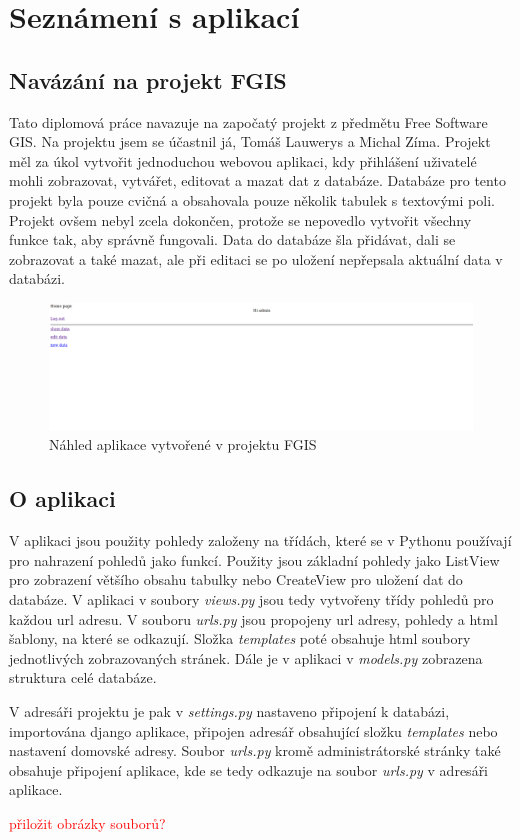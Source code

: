\chapter{Seznámení s aplikací}
\label{3-seznameni-s-aplikaci}

\section{Navázání na projekt FGIS}

Tato diplomová práce navazuje na započatý projekt z předmětu Free
Software GIS. Na projektu jsem se účastnil já, Tomáš Lauwerys a Michal
Zíma. Projekt měl za úkol vytvořit jednoduchou webovou aplikaci, kdy
přihlášení uživatelé mohli zobrazovat, vytvářet, editovat a mazat dat
z databáze. Databáze pro tento projekt byla pouze cvičná a obsahovala
pouze několik tabulek s textovými poli. Projekt ovšem nebyl zcela
dokončen, protože se nepovedlo vytvořit všechny funkce tak, aby
správně fungovali. Data do databáze šla přidávat, dali se zobrazovat a
také mazat, ale při editaci se po uložení nepřepsala aktuální data v
databázi.

\begin{figure}[H] \centering
    \includegraphics[width=400pt]{./pictures/4-nahled-menu-fgis.PNG}
    \caption[Náhled aplikace vytvořené v projektu FGIS]{Náhled aplikace vytvořené v projektu FGIS}
	\label{fig:Náhled aplikace}              
\end{figure}

 \newpage
 
 \section{O aplikaci}

 V aplikaci jsou použity pohledy založeny na třídách, které se v
 Pythonu používají pro nahrazení pohledů jako funkcí. Použity jsou
 základní pohledy jako ListView pro zobrazení většího obsahu tabulky
 nebo CreateView pro uložení dat do databáze. V aplikaci v soubory
 \emph{views.py} jsou tedy vytvořeny třídy pohledů pro každou url
 adresu. V souboru \emph{urls.py} jsou propojeny url adresy, pohledy a
 html šablony, na které se odkazují. Složka \emph{templates} poté
 obsahuje html soubory jednotlivých zobrazovaných stránek. Dále je v
 aplikaci v \emph{models.py} zobrazena struktura celé databáze.

 V adresáři projektu je pak v \emph{settings.py} nastaveno připojení k
 databázi, importována django aplikace, připojen adresář obsahující
 složku \emph{templates} nebo nastavení domovské adresy. Soubor
 \emph{urls.py} kromě administrátorské stránky také obsahuje připojení
 aplikace, kde se tedy odkazuje na soubor \emph{urls.py} v adresáři
 aplikace.

\textcolor{red}{přiložit obrázky souborů?}


